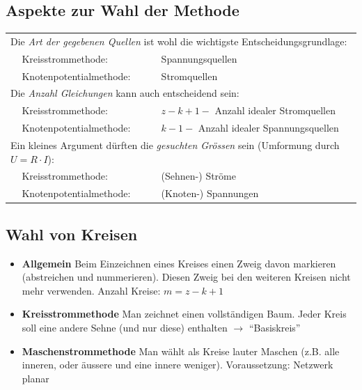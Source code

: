 \subsection{Aspekte zur Wahl der Methode}
\begin{tabular}{lll}
	\multicolumn{3}{l}{Die \textit{Art der gegebenen Quellen} ist wohl die wichtigste Entscheidungsgrundlage:}\\
	&Kreisstrommethode: &Spannungsquellen\\
	&Knotenpotentialmethode: &Stromquellen\\
	\multicolumn{3}{l}{Die \textit{Anzahl Gleichungen} kann auch entscheidend sein:}\\
	&Kreisstrommethode: &$z-k+1-$ Anzahl idealer Stromquellen\\
	&Knotenpotentialmethode: &$k-1-$ Anzahl idealer Spannungsquellen\\
	\multicolumn{3}{l}{Ein kleines Argument dürften die \textit{gesuchten Grössen} sein (Umformung durch $U=R \cdot I$):}\\
	&Kreisstrommethode: &(Sehnen-) Ströme\\
	&Knotenpotentialmethode: &(Knoten-) Spannungen
\end{tabular}

\subsection{Wahl von Kreisen}
\begin{itemize}
\item \textbf{Allgemein}
Beim Einzeichnen eines Kreises einen Zweig davon markieren (abstreichen und nummerieren). Diesen Zweig bei den weiteren Kreisen nicht mehr verwenden. Anzahl Kreise: $m = z-k+1$\\[-5pt]
\item \textbf{Kreisstrommethode}
Man zeichnet einen vollständigen Baum. Jeder Kreis soll eine andere Sehne (und nur diese) enthalten $\rightarrow$ "`Basiskreis"'\\[-5pt]
\item \textbf{Maschenstrommethode}
Man wählt als Kreise lauter Maschen (z.B. alle inneren, oder äussere und eine innere weniger). Voraussetzung: Netzwerk planar\\[-5pt]
\end{itemize}

